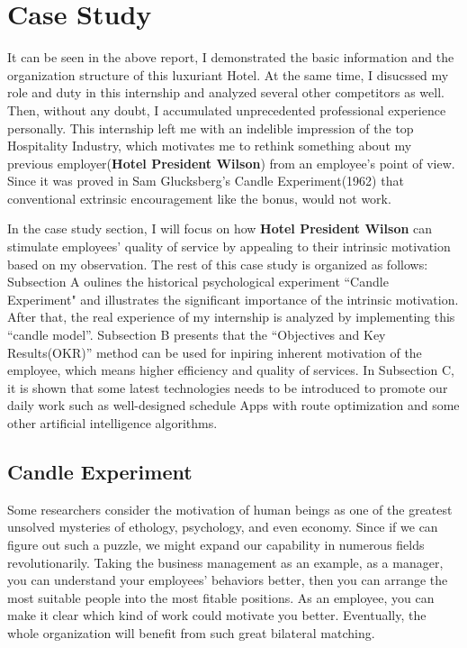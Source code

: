 \documentclass[12pt,onecolumn,a4paper]{IEEEtran}
\begin{document}
\newpage
\section{\textbf{Case Study}}
It can be seen in the above report, I demonstrated the basic information and the organization structure of this luxuriant Hotel. At the same time, I disucssed my role and duty in this internship and analyzed several other competitors as well. Then, without any doubt, I accumulated unprecedented professional experience personally. This internship left me with an indelible impression of the top Hospitality Industry, which motivates me to rethink something about my previous employer(\textbf{Hotel President Wilson}) from an employee's point of view. Since it was proved in Sam Glucksberg's Candle Experiment(1962) that conventional extrinsic encouragement like the bonus, would not work. 

In the case study section, I will focus on how \textbf{Hotel President Wilson} can stimulate employees' quality of service by appealing to their intrinsic motivation based on my observation. The rest of this case study is organized as follows: Subsection A oulines the historical psychological experiment ``Candle Experiment" and illustrates the significant importance of the intrinsic motivation. After that, the real experience of my internship is analyzed by implementing this ``candle model''. Subsection B presents that the ``Objectives and Key Results(OKR)'' method can be used for inpiring inherent motivation of the employee, which means higher efficiency and quality of services. In Subsection C, it is shown that some latest technologies needs to be introduced to promote our daily work such as well-designed schedule Apps with route optimization and some other artificial intelligence algorithms.

\subsection{\textbf{Candle Experiment}}
Some researchers consider the motivation of human beings as one of the greatest unsolved mysteries of ethology, psychology, and even economy. Since if we can figure out such a puzzle, we might expand our capability in numerous fields revolutionarily. Taking the business management as an example, as a manager, you can understand your employees' behaviors better, then you can arrange the most suitable people into the most fitable positions. As an employee, you can make it clear which kind of work could motivate you better. Eventually, the whole organization will benefit from such great bilateral matching. 
\end{document}
